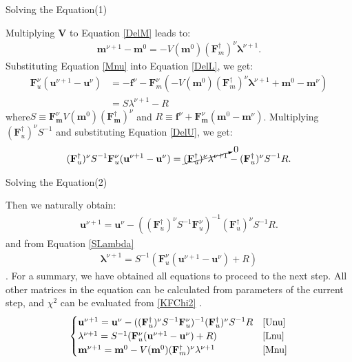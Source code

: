 \documentclass[
	xcolor=dvipsnames,
	aspectratio=169,	
	10pt, 
	]{beamer}
\begin{document}
\begin{frame}{Solving the Equation(1)}
	\begin{block}{}
		Multiplying \textbf V to Equation \eqref{DelM} leads to:		\vspace{-2 mm}
		\begin{align}
			\mathbf{m}^{\nu+1}-\mathbf{m}^0=-V(\mathbf m^0)(\mathbf{F}_m^\dagger)^\nu\mathbf\lambda^{\nu+1}.\label{Mnu}
		\end{align}
		Substituting Equation \eqref{Mnu} into Equation \eqref{DelL}, we get:\vspace{-2 mm}
		\begin{align}
			\mathbf F^\nu_u(\mathbf u^{\nu+1}-\mathbf u^\nu) &= - \mathbf f^\nu - \mathbf F^\nu_m (-V(\mathbf m^0)(\mathbf{F}_m^\dagger)^\nu\mathbf\lambda^{\nu+1} +\mathbf{m}^0-\mathbf{m}^\nu  )\nonumber\\
			&=  S\lambda^{\nu+1}  - R\label{SLambda}
		\end{align}
		where$S\equiv \mathbf{F}_\mathbf{m}^\nu V(\mathbf m^0)(\mathbf{F}_\mathbf{m}^\dagger )^\nu$  and $R\equiv \mathbf f^\nu + \mathbf{F}_\mathbf{m}^\nu(\mathbf{m}^0-\mathbf{m}^\nu)$. Multiplying $(\mathbf{F}_u^\dagger)^\nu S^{-1}$ and substituting Equation \eqref{DelU}, we get:\vspace{-2 mm}
		\begin{align}
			(\mathbf{F}_u^\dagger)^\nu S^{-1}\mathbf F^\nu_u(\mathbf u^{\nu+1}-\mathbf u^\nu) = \cancelto{0}{(\mathbf F_u^\dagger)^\nu\mathbf \lambda^{\nu+1}}-(\mathbf{F}_u^\dagger)^\nu S^{-1}R.
		\end{align}
	\end{block}
\end{frame}
\begin{frame}{Solving the Equation(2)}
	\begin{block}{}
		Then we naturally obtain:
		\begin{align}
			\mathbf{u}^{\nu+1}=\mathbf{u}^\nu - ((\mathbf{F}_u^\dagger)^\nu S^{-1}\mathbf F^\nu_u)^{-1}(\mathbf{F}_u^\dagger)^\nu S^{-1}R\label{Unu}.
		\end{align} 
		and from Equation \eqref{SLambda}
		\begin{align}
			\mathbf\lambda^{\nu+1} = S^{-1}(\mathbf F^\nu_u(\mathbf u^{\nu+1}-\mathbf u^\nu) + R)\label{Lnu}
		\end{align}.
		For a summary, we have obtained all equations to proceed to the next step. All other matrices in the equation can be calculated from parameters of the current step, and $\chi^2$ can be evaluated from \eqref{KFChi2} .
		\begin{align*}
			\begin{cases}
				\mathbf{u}^{\nu+1}=\mathbf{u}^\nu - ((\mathbf{F}_u^\dagger)^\nu S^{-1}\mathbf F^\nu_u)^{-1}(\mathbf{F}_u^\dagger)^\nu S^{-1}R&\eqref{Unu}\\
				\mathbf\lambda^{\nu+1} = S^{-1}(\mathbf F^\nu_u(\mathbf u^{\nu+1}-\mathbf u^\nu) + R)&\eqref{Lnu}\\
				\mathbf{m}^{\nu+1}=\mathbf{m}^0-V(\mathbf m^0)(\mathbf{F}_m^\dagger)^\nu\mathbf\lambda^{\nu+1}&\eqref{Mnu}
			\end{cases}
		\end{align*}
	\end{block}
\end{frame}
\end{document}
